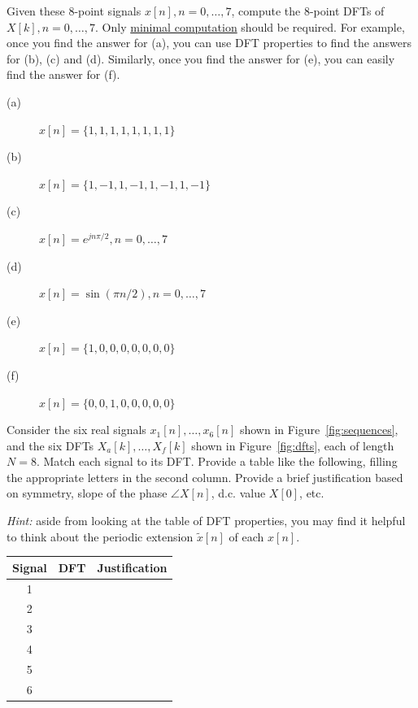 \documentclass[12pt]{report}
\begin{document}

Given these 8-point signals $x[n], n = 0, \ldots, 7$, compute the 8-point DFTs of $X[k], n = 0, \ldots, 7$. Only \underline{minimal computation} should be required. For example, once you find the answer for (a), you can use DFT properties to find the answers for (b), (c) and (d). Similarly, once you find the answer for (e), you can easily find the answer for (f).

\begin{description}
	\item [(a)] $x[n] = \{1, 1, 1, 1, 1, 1, 1, 1\}$
	\item [(b)] $x[n] = \{1, -1, 1, -1, 1, -1, 1, -1\}$
	\item [(c)] $x[n] = e^{jn\pi/2}, n = 0, \ldots, 7$
	\item [(d)] $x[n] = \sin(\pi n/2), n = 0, \ldots, 7$
	\item [(e)] $x[n] = \{1, 0, 0, 0, 0, 0, 0, 0\}$
	\item [(f)] $x[n] = \{0, 0, 1, 0, 0, 0, 0, 0\}$
\end{description}

\newpage
{} 

Consider the six real signals $x_1[n], \ldots, x_6[n]$ shown in Figure~\ref{fig:sequences}, and the six DFTs $X_a[k], \ldots, X_f[k]$ shown in Figure~\ref{fig:dfts}, each of length $N = 8$. Match each signal to its DFT. Provide a table like the following, filling the appropriate letters in the second column. Provide a brief justification based on symmetry, slope of the phase  $\angle X[n]$, d.c. value $X[0]$, etc. 

\noindent\textit{Hint:} aside from looking at the table of DFT properties, you may find it helpful to think about the periodic extension $\tilde{x}[n]$ of each $x[n]$.


\begin{center}
	\begin{tabular}{c|c|p{10cm}}
	Signal & DFT & Justification \\
	\hline
	1 & & \\
	2 & & \\
	3 & & \\
	4 & & \\
	5 & & \\
	6 & & \\
	\hline
\end{tabular}
\end{center}
\end{document}

